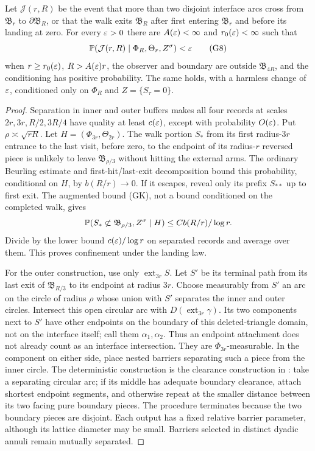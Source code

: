 \begin{lemma}\label{g:extra}
Let \(\mathcal J(r,R)\) be the event that more than two disjoint
interface arcs cross from \(\mathfrak B_r\) to
\(\partial\mathfrak B_R\), or that the walk exits
\(\mathfrak B_R\) after first entering \(\mathfrak B_r\) and before
its landing at zero. For every \(\varepsilon>0\) there are
\(A(\varepsilon)<\infty\) and \(r_0(\varepsilon)<\infty\)
such that
\[
 \mathbb P(\mathcal J(r,R)\mid\Phi_R,\Theta_r,Z^\sigma)<\varepsilon
 \tag{G8}
\]
when \(r\geq r_0(\varepsilon)\), \(R>A(\varepsilon)r\), the observer and boundary are outside
\(\mathfrak B_{4R}\), and the conditioning has positive probability.
The same holds, with a harmless change of \(\varepsilon\), conditioned
only on \(\Phi_R\) and \(Z=\{S_\tau=0\}\).
\end{lemma}

\begin{proof}
Separation in inner and outer buffers makes all four records at
scales \(2r,3r,R/2,3R/4\) have quality at least \(c(\varepsilon)\), except
with probability \(O(\varepsilon)\). Put \(\rho\asymp\sqrt{rR}\).
Let \(H=(\Phi_{3r},\Theta_{2r})\). The walk portion \(S_*\) from its
first radius-\(3r\) entrance to the last visit, before zero, to the
endpoint of its radius-\(r\) reversed piece is unlikely to leave
\(\mathfrak B_{\rho/3}\) without hitting the external arms. The
ordinary Beurling estimate and first-hit/last-exit decomposition
bound this probability, conditional on \(H\), by
\(b(R/r)\to0\). If it escapes, reveal only its prefix \(S_{**}\)
up to first exit. The augmented bound (GK), not a bound conditioned
on the completed walk, gives
\[
 \mathbb P(S_*\not\subset\mathfrak B_{\rho/3},Z^\sigma\mid H)
       \leq C b(R/r)/\log r.
\]
Divide by the lower bound \(c(\varepsilon)/\log r\) on separated records
and average over them. This proves confinement under the landing law.

For the outer construction, use only \(\operatorname{ext}_{3r}S\).
Let \(S'\) be its terminal path from its last exit of
\(\mathfrak B_{R/3}\) to its endpoint at radius \(3r\).
Choose measurably from \(S'\) an arc on the circle of radius \(\rho\)
whose union with \(S'\) separates the inner and outer circles.
Intersect this open circular arc with \(D(\operatorname{ext}_{3r}\gamma)\).
Its two components next to \(S'\) have other endpoints on the boundary
of this deleted-triangle domain, not on the interface itself;
call them \(\alpha_1,\alpha_2\). Thus an endpoint attachment does
not already count as an interface intersection. They are
\(\Phi_{3r}\)-measurable. In the component on either side, place
nested barriers separating such a piece from the inner circle.
The deterministic construction is the clearance construction in
\cite[proof of (3.48)]{SSdiscrete}: take a separating circular arc;
if its middle has adequate boundary clearance, attach shortest
endpoint segments, and otherwise repeat at the smaller distance
between its two facing pure boundary pieces. The procedure
terminates because the two boundary pieces are disjoint.
Each output has a fixed relative barrier parameter, although its
lattice diameter may be small. Barriers selected in distinct
dyadic annuli remain mutually separated.


\end{proof}
